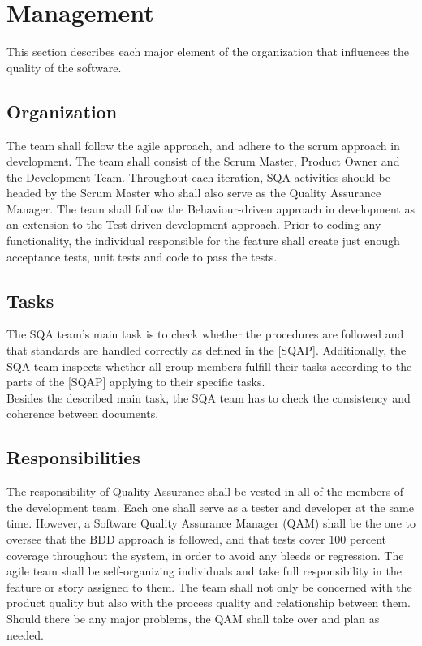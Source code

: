\documentclass{report}
\begin{document}
\newpage
\section{Management}
This section describes each major element of the organization that influences the quality of the software.

\subsection{Organization}
The team shall follow the agile approach, and adhere to the scrum approach in development. The team shall consist of the Scrum Master, Product Owner and the Development Team. Throughout each iteration, SQA activities should be headed by the Scrum Master who shall also serve as the Quality Assurance Manager. The team shall follow the Behaviour-driven approach in development as an extension to the Test-driven development approach. Prior to coding any functionality, the individual responsible for the feature shall create just enough acceptance tests, unit tests and code to pass the tests. 

\subsection{Tasks}
The SQA team’s main task is to check whether the procedures are followed and that standards are handled correctly as defined in the [SQAP]. Additionally, the SQA team inspects whether all group members fulfill their tasks according to the parts of the [SQAP] applying to their specific tasks. \\

Besides the described main task, the SQA team has to check the consistency and coherence between documents.

\subsection{Responsibilities}
The responsibility of Quality Assurance shall be vested in all of the members of the development team. Each one shall serve as a tester and developer at the same time. However, a Software Quality Assurance Manager (QAM) shall be the one to oversee that the BDD approach is followed, and that tests cover 100 percent coverage throughout the system, in order to avoid any bleeds or regression. The agile team shall be self-organizing individuals and take full responsibility in the feature or story assigned to them. The team shall not only be concerned with the product quality but also with the process quality and relationship between them. Should there be any major problems, the QAM shall take over and plan as needed. 
\end{document}
